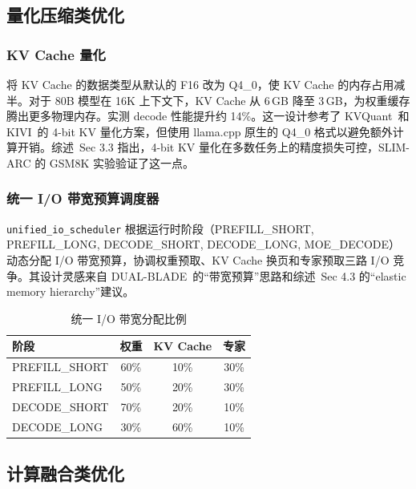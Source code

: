 \subsection{量化压缩类优化}

\subsubsection{KV Cache 量化}

将 KV Cache 的数据类型从默认的 F16 改为 Q4\_0，使 KV Cache 的内存占用减半。对于 80B 模型在 16K 上下文下，KV Cache 从 6\,GB 降至 3\,GB，为权重缓存腾出更多物理内存。实测 decode 性能提升约 14\%。这一设计参考了 KVQuant~\cite{kvquant2024}和 KIVI~\cite{kivi2024}的 4-bit KV 量化方案，但使用 llama.cpp 原生的 Q4\_0 格式以避免额外计算开销。综述~\cite{survey2026}Sec 3.3 指出，4-bit KV 量化在多数任务上的精度损失可控，SLIM-ARC 的 GSM8K 实验验证了这一点。

\subsubsection{统一 I/O 带宽预算调度器}

\texttt{unified\_io\_scheduler} 根据运行时阶段（PREFILL\_SHORT, PREFILL\_LONG, DECODE\_SHORT, DECODE\_LONG, MOE\_DECODE）动态分配 I/O 带宽预算，协调权重预取、KV Cache 换页和专家预取三路 I/O 竞争。其设计灵感来自 DUAL-BLADE~\cite{dualblade2024}的“带宽预算”思路和综述~\cite{survey2026}Sec 4.3 的“elastic memory hierarchy”建议。

\begin{table}[H]
    \centering
    \caption{统一 I/O 带宽分配比例}
    \label{tab:budget_ratios}
    \begin{tabular}{lccc}
        \toprule
        \textbf{阶段} & \textbf{权重} & \textbf{KV Cache} & \textbf{专家} \\
        \midrule
        PREFILL\_SHORT & 60\% & 10\% & 30\% \\
        PREFILL\_LONG  & 50\% & 20\% & 30\% \\
        DECODE\_SHORT  & 70\% & 20\% & 10\% \\
        DECODE\_LONG   & 30\% & 60\% & 10\% \\
        \bottomrule
    \end{tabular}
\end{table}

\subsection{计算融合类优化}

